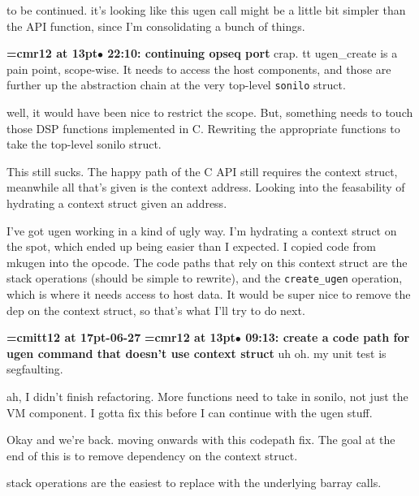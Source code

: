 to be continued. it's looking like this ugen call might be a little bit simpler than the API function, since I'm consolidating a bunch of things.
\par

{\smallskip\noindent\bf\font\titlefont=cmr12 at 13pt\titlefont $\bullet$ 22:10: continuing opseq port}\smallskip
crap. {tt ugen\_create} is a pain point, scope-wise. It needs to access the host components, and those are further up the abstraction chain at the very top-level {\tt sonilo} struct.
\par

well, it would have been nice to restrict the scope. But, something needs to touch those DSP functions implemented in C. Rewriting the appropriate functions to take the top-level sonilo struct.
\par

This still sucks. The happy path of the C API still requires the context struct, meanwhile all that's given is the context address. Looking into the feasability of hydrating a context struct given an address.
\par

I've got ugen working in a kind of ugly way. I'm hydrating a context struct on the spot, which ended up being easier than I expected. I copied code from mkugen into the opcode. The code paths that rely on this context struct are the stack operations (should be simple to rewrite), and the {\tt create\_ugen} operation, which is where it needs access to host data. It would be super nice to remove the dep on the context struct, so that's what I'll try to do next.
\par

{\medskip\noindent\bf\font\titlefont=cmitt12 at 17pt-06-27}\medskip
{\smallskip\noindent\bf\font\titlefont=cmr12 at 13pt\titlefont $\bullet$ 09:13: create a code path for ugen command that doesn't use context struct}\smallskip
uh oh. my unit test is segfaulting.
\par

ah, I didn't finish refactoring. More functions need to take in sonilo, not just the VM component. I gotta fix this before I can continue with the ugen stuff.
\par

Okay and we're back. moving onwards with this codepath fix. The goal at the end of this is to remove dependency on the context struct.
\par

stack operations are the easiest to replace with the underlying barray calls.
\par

